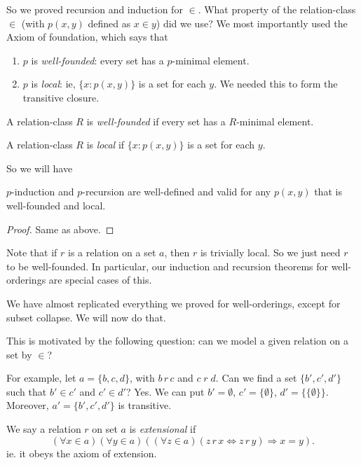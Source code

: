 \documentclass[a4paper]{article}
\begin{document}
So we proved recursion and induction for $\in$. What property of the relation-class $\in$ (with $p(x, y)$ defined as $x\in y$) did we use? We most importantly used the Axiom of foundation, which says that
\begin{enumerate}
  \item $p$ is \emph{well-founded}: every set has a $p$-minimal element.
  \item $p$ is \emph{local}: ie, $\{x: p(x, y)\}$ is a set for each $y$. We needed this to form the transitive closure.
\end{enumerate}

\begin{defi}
  A relation-class $R$ is \emph{well-founded} if every set has a $R$-minimal element.
\end{defi}

\begin{defi}
  A relation-class $R$ is \emph{local} if $\{x: p(x, y)\}$ is a set for each $y$.
\end{defi}

So we will have
\begin{prop}
  $p$-induction and $p$-recursion are well-defined and valid for any $p(x, y)$ that is well-founded and local.
\end{prop}

\begin{proof}
  Same as above.
\end{proof}
Note that if $r$ is a relation on a set $a$, then $r$ is trivially local. So we just need $r$ to be well-founded. In particular, our induction and recursion theorems for well-orderings are special cases of this.

We have almost replicated everything we proved for well-orderings, except for subset collapse. We will now do that.

This is motivated by the following question: can we model a given relation on a set by $\in$?

For example, let $a = \{b, c, d\}$, with $b\,r\,c$ and $c\;r\;d$. Can we find a set $\{b', c', d'\}$ such that $b'\in c'$ and $c'\in d'$? Yes. We can put $b' = \emptyset$, $c' = \{\emptyset\}$, $d' = \{\{\emptyset\}\}$. Moreover, $a' = \{b', c', d'\}$ is transitive.

\begin{defi}
  We say a relation $r$ on set $a$ is \emph{extensional} if
  \[
    (\forall x\in a)(\forall y\in a)((\forall z\in a)(z\,r\,x \Leftrightarrow z\,r\,y)\Rightarrow  x = y).
  \]
  ie. it obeys the axiom of extension.
\end{defi}
\end{document}
